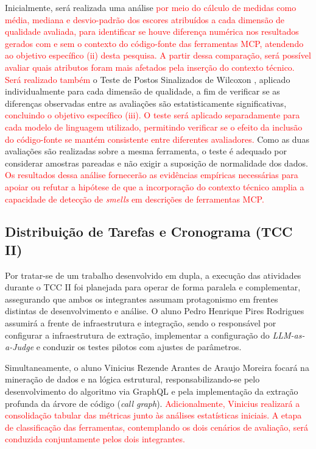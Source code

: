 Inicialmente, será realizada uma análise \textcolor{red}{por meio do cálculo de medidas como média, mediana e desvio-padrão dos escores atribuídos a cada dimensão de qualidade avaliada, para identificar se houve diferença numérica nos resultados gerados com e sem o contexto do código-fonte das ferramentas MCP, atendendo ao objetivo específico (ii) desta pesquisa. A partir dessa comparação, será possível avaliar quais atributos foram mais afetados pela inserção do contexto técnico. Será realizado também} o Teste de Postos Sinalizados de Wilcoxon \cite{wilcoxon1945individual}, aplicado individualmente para cada dimensão de qualidade, a fim de verificar se as diferenças observadas entre as avaliações são estatisticamente significativas, \textcolor{red}{concluindo o objetivo específico (iii). O teste será aplicado separadamente para cada modelo de linguagem utilizado, permitindo verificar se o efeito da inclusão do código-fonte se mantém consistente entre diferentes avaliadores.} Como as duas avaliações são realizadas sobre a mesma ferramenta, o teste é adequado por considerar amostras pareadas e não exigir a suposição de normalidade dos dados. \textcolor{red}{Os resultados dessa análise fornecerão as evidências empíricas necessárias para apoiar ou refutar a hipótese de que a incorporação do contexto técnico amplia a capacidade de detecção de \textit{smells} em descrições de ferramentas MCP.}

\subsection{Distribuição de Tarefas e Cronograma (TCC II)}
Por tratar-se de um trabalho desenvolvido em dupla, a execução das atividades durante o TCC II foi planejada para operar de forma paralela e complementar, assegurando que ambos os integrantes assumam protagonismo em frentes distintas de desenvolvimento e análise. O aluno Pedro Henrique Pires Rodrigues assumirá a frente de infraestrutura e integração, sendo o responsável por configurar a infraestrutura de extração, implementar a configuração do \textit{LLM-as-a-Judge} e conduzir os testes pilotos com ajustes de parâmetros.

Simultaneamente, o aluno Vinicius Rezende Arantes de Araujo Moreira focará na mineração de dados e na lógica estrutural, responsabilizando-se pelo desenvolvimento do algoritmo via GraphQL e pela implementação da extração profunda da árvore de código (\textit{call graph}). \textcolor{red}{Adicionalmente, Vinicius realizará a consolidação tabular das métricas junto às análises estatísticas iniciais. A etapa de classificação das ferramentas, contemplando os dois cenários de avaliação, será conduzida conjuntamente pelos dois integrantes.}

